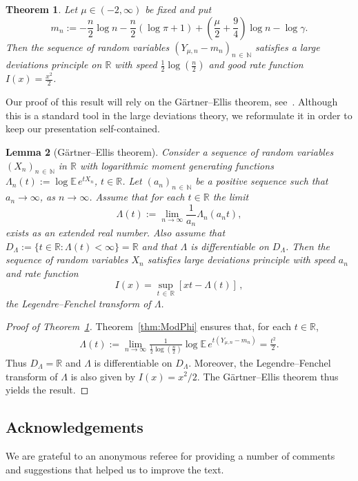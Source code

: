 \documentclass[10pt]{amsart}
\newtheorem{theo}{Theorem}[section]
\newtheorem{lemm}[theo]{Lemma}\newtheorem{prop}[theo]{Proposition}\newtheorem{coro}[theo]{Corollary}\newtheorem{conj}[theo]{Conjecture}
\theoremstyle{definition}\newtheorem{defi}[theo]{Definition}\newtheorem{rema}[theo]{Remark}\newtheorem{exam}[theo]{Example}\newtheorem{exem}[theo]{Example}\newtheorem{nota}[theo]{Notation}
\newcommand{\R}{\mathbb{R}}
\newcommand{\N}{\mathbb{N}}
\newcommand{\EE}{\mathbb{E}\,}
\begin{document}
\begin{theo}\label{thm:LDP}
Let $\mu\in(-2,\infty)$ be fixed and put
\[
m_n:=-\frac{n}{2}\log n-\frac{n}{2}(\log\pi +1)+\left(\frac{\mu}{2}+\frac{9}{4}\right)\log n -\log\gamma.
\]
Then the sequence of random variables $(Y_{\mu,n}-m_n)_{n\,\in\,\N}$ satisfies a large deviations principle on $\R$ with speed $\frac{1}{2}\log(\frac{n}{2})$ and good rate function $I(x)=\frac{x^2}{2}$.
\end{theo}

Our proof of this result will rely on the G\"artner--Ellis theorem, see~\cite[Section~2.3]{DZ}. Although this is a standard tool in the large deviations theory, we reformulate it in order to keep our presentation self-contained.

\begin{lemm}[G\"artner--Ellis theorem]
Consider a sequence of random variables $(X_n)_{n\,\in\,\mathbb{N}}$ in $\R$ with logarithmic moment generating functions $\Lambda_n(t):=\log\EE e^{tX_n}$, $t\in\R$. Let $(a_n)_{n\,\in\,\mathbb{N}}$ be a positive sequence such that $a_n\to\infty$, as $n\to\infty$. Assume that for each $t\in\R$ the limit
\[
\Lambda(t):=\lim_{n\rightarrow\infty}\frac{1}{a_n}\Lambda_n(a_nt),
\]
exists as an extended real number. Also assume that $D_\Lambda:=\{t\in\R:\Lambda(t)<\infty\}=\R$ and that $\Lambda$ is differentiable on $D_\Lambda$. Then the sequence of random variables $X_n$ satisfies large deviations principle with speed $a_n$ and rate function
\[
I(x)=\sup\limits_{t\,\in\,\R}[xt-\Lambda(t)]
\,,
\]
the Legendre--Fenchel transform of $\Lambda$.
\end{lemm}

\begin{proof}[Proof of Theorem~\ref{thm:LDP}]
Theorem~\ref{thm:ModPhi} ensures that, for each $t\in\R$,
\begin{align*}
\Lambda(t) := \lim_{n\rightarrow\infty}\frac{1}{\frac{1}{2}\log(\frac{n}{2})}\log\EE e^{t(Y_{\mu,n}-m_n)} = \frac{t^2}{2}.
\end{align*}
Thus $D_\Lambda=\R$ and $\Lambda$ is differentiable on $D_\Lambda$. Moreover, the Legendre--Fenchel transform of $\Lambda$ is also given by $I(x)=x^2/2$. The G\"artner--Ellis theorem thus yields the result.
\end{proof}

\subsection*{Acknowledgements}
We are grateful to an anonymous referee for providing a number of comments and suggestions that helped us to improve the text.
\end{document}
